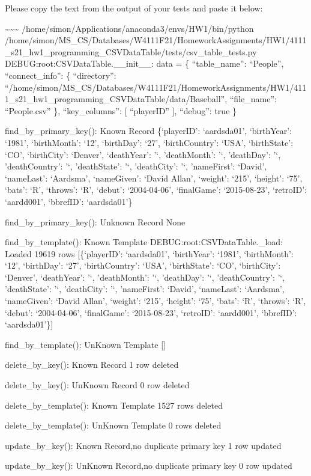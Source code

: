 \documentclass[11pt]{article}
\begin{document}
Please copy the text from the output of your tests and paste it below:

    \textasciitilde\textasciitilde\textasciitilde{}
/home/simon/Applications/anaconda3/envs/HW1/bin/python
/home/simon/MS\_CS/Databases/W4111F21/HomeworkAssignments/HW1/4111\_s21\_hw1\_programming\_CSVDataTable/tests/csv\_table\_tests.py
DEBUG:root:CSVDataTable.\_\_init\_\_: data = \{ ``table\_name'':
``People'', ``connect\_info'': \{ ``directory'':
``/home/simon/MS\_CS/Databases/W4111F21/HomeworkAssignments/HW1/4111\_s21\_hw1\_programming\_CSVDataTable/data/Baseball'',
``file\_name'': ``People.csv'' \}, ``key\_columns'': {[} ``playerID''
{]}, ``debug'': true \}

find\_by\_primary\_key(): Known Record \{`playerID': `aardsda01',
`birthYear': `1981', `birthMonth': `12', `birthDay': `27',
`birthCountry': `USA', `birthState': `CO', `birthCity': `Denver',
`deathYear': '`, 'deathMonth': '`, 'deathDay': '`, 'deathCountry': '`,
'deathState': '`, 'deathCity': '`, 'nameFirst': `David', `nameLast':
`Aardsma', `nameGiven': `David Allan', `weight': `215', `height': `75',
`bats': `R', `throws': `R', `debut': `2004-04-06', `finalGame':
`2015-08-23', `retroID': `aardd001', `bbrefID': `aardsda01'\}

find\_by\_primary\_key(): Unknown Record None

find\_by\_template(): Known Template DEBUG:root:CSVDataTable.\_load:
Loaded 19619 rows {[}\{`playerID': `aardsda01', `birthYear': `1981',
`birthMonth': `12', `birthDay': `27', `birthCountry': `USA',
`birthState': `CO', `birthCity': `Denver', `deathYear': '`,
'deathMonth': '`, 'deathDay': '`, 'deathCountry': '`, 'deathState': '`,
'deathCity': '`, 'nameFirst': `David', `nameLast': `Aardsma',
`nameGiven': `David Allan', `weight': `215', `height': `75', `bats':
`R', `throws': `R', `debut': `2004-04-06', `finalGame': `2015-08-23',
`retroID': `aardd001', `bbrefID': `aardsda01'\}{]}

find\_by\_template(): UnKnown Template {[}{]}

delete\_by\_key(): Known Record 1 row deleted

delete\_by\_key(): UnKnown Record 0 row deleted

delete\_by\_template(): Known Template 1527 rows deleted

delete\_by\_template(): UnKnown Template 0 rows deleted

update\_by\_key(): Known Record,no duplicate primary key 1 row updated

update\_by\_key(): UnKnown Record,no duplicate primary key 0 row updated
\end{document}
